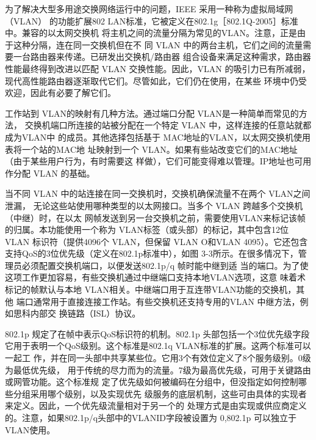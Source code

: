 为了解决大型多用途交换网络运行中的问题，IEEE 采用一种称为虚拟局域网（VLAN）
的功能扩展802 LAN标准，它被定义在802.1g［802.1Q-2005］标准中。兼容的以太网交换机
将主机之间的流量分隔为常见的VLAN。注意，正是由于这种分隔，连在同一交换机但在不
同 VLAN 中的两台主机，它们之间的流量需要一台路由器来传递。已研发出交换机/路由器
组合设备来满足这种需求，路由器性能最终得到改进以匹配 VLAN 交换性能。因此，VLAN
的吸引力已有所减弱，现代高性能路由器逐渐取代它们。尽管如此，它们仍在使用，在某些
环境中仍受欢迎，因此有必要了解它们。

工作站到 VLAN的映射有几种方法。通过端口分配 VLAN是一种简单而常见的方法，
交换机端口所连接的站被分配在一个特定 VLAN 中，这样连接的任意站就都成为VLAN中
的成员。其他选择包括基于 MAC地址的VLAN，以太网交换机使用表将一个站的MAC地
址映射到一个 VLAN。如果有些站改变它们的MAC地址（由于某些用户行为，有时需要这
样做），它们可能变得难以管理。IP地址也可用作分配 VLAN 的基础。

当不同 VLAN 中的站连接在同一交换机时，交换机确保流量不在两个 VLAN之间泄漏，
无论这些站使用哪种类型的以太网接口。当多个 VLAN 跨越多个交换机（中继）时，在以太
网帧发送到另一台交换机之前，需要使用VLAN来标记该帧的归属。本功能使用一个称为
VLAN标签（或头部）的标记，其中包含12位 VLAN 标识符（提供4096个 VLAN，但保留
VLAN O和VLAN 4095）。它还包含支持QoS的3位优先级（定义在802.1p标准中），如图
3-3所示。在很多情况下，管理员必须配置交换机端口，以便发送802.1p/q 帧时能中继到适
当的端口。为了使这项工作更加容易，有些交换机通过中继端口支持本地VLAN选项，这意
味着术标记的帧默认与本地 VLAN相关。中继端口用于互连带VLAN功能的交换机，其他
端口通常用于直接连接工作站。有些交换机还支持专用的VLAN 中继方法，例如思科内部交
换链路（ISL）协议。

802.1p 规定了在帧中表示QoS标识符的机制。802.1p 头部包括一个3位优先级字段
它用于表明一个QoS级别。这个标准是802.1q VLAN标准的扩展。这两个标准可以一起工
作，并在同一头部中共享某些位。它用3个有效位定义了8个服务级别。0级为最低优先级，
用于传统的尽力而为的流量。7级为最高优先级，可用于关键路由或网管功能。这个标准规
定了优先级如何被编码在分组中，但没指定如何控制哪些分组采用哪个级别，以及实现优先
级服务的底层机制，这些可由具体的实现者来定义。因此，一个优先级流量相对于另一个的
处理方式是由实现或供应商定义的。注意，如果802.1p/q头部中的VLANID字段被设置为
0,802.1p 可以独立于 VLAN使用。

